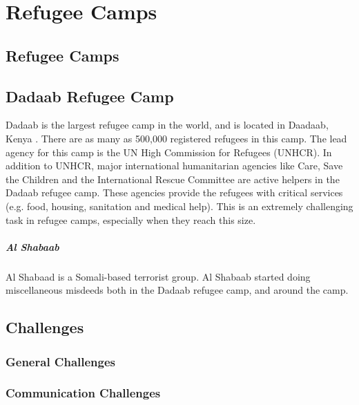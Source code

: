\chapter{Refugee Camps}
\label{chp:refugeecamps} 

\section{Refugee Camps}

\section{Dadaab Refugee Camp}
Dadaab is the largest refugee camp in the world, and is located in Daadaab, Kenya \cite{dadaab}. There are as many as 500,000 registered refugees in this camp. The lead agency for this camp is the UN High Commission for Refugees (UNHCR). In addition to UNHCR, major international humanitarian agencies like Care, Save the Children and the International Rescue Committee  are active helpers in the Dadaab refugee camp. These agencies provide the refugees with critical services (e.g. food, housing, sanitation and medical help). This is an extremely challenging task in refugee camps, especially when they reach this size. 

\paragraph{Al Shabaab}
Al Shabaad is a Somali-based terrorist group. Al Shabaab started doing miscellaneous misdeeds both in the Dadaab refugee camp, and around the camp.  


\section{Challenges}

\subsection{General Challenges}

\subsection{Communication Challenges}

